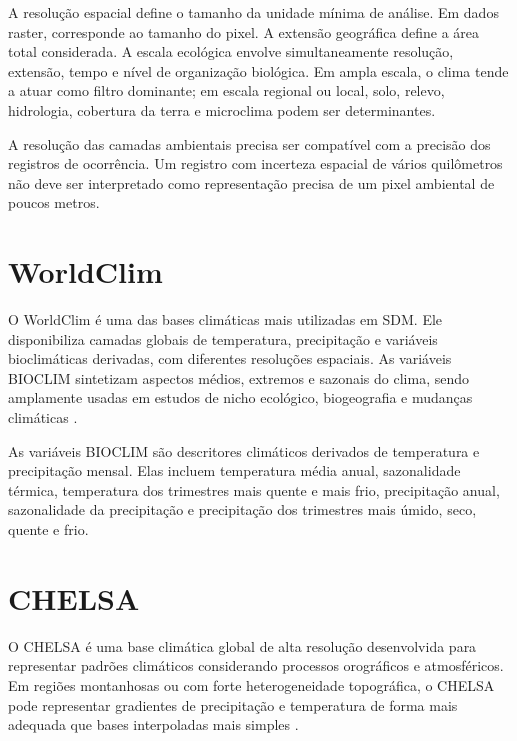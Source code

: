 \documentclass{ueap-sdm}
\begin{document}
A resolução espacial define o tamanho da unidade mínima de análise. Em dados raster, corresponde ao tamanho do pixel. A extensão geográfica define a área total considerada. A escala ecológica envolve simultaneamente resolução, extensão, tempo e nível de organização biológica. Em ampla escala, o clima tende a atuar como filtro dominante; em escala regional ou local, solo, relevo, hidrologia, cobertura da terra e microclima podem ser determinantes.

\begin{atencao}[title={\faExclamationTriangle\quad Compatibilidade entre ocorrência e ambiente}]
	A resolução das camadas ambientais precisa ser compatível com a precisão dos registros de ocorrência. Um registro com incerteza espacial de vários quilômetros não deve ser interpretado como representação precisa de um pixel ambiental de poucos metros.
\end{atencao}

\section{WorldClim}

O WorldClim é uma das bases climáticas mais utilizadas em SDM. Ele disponibiliza camadas globais de temperatura, precipitação e variáveis bioclimáticas derivadas, com diferentes resoluções espaciais. As variáveis BIOCLIM sintetizam aspectos médios, extremos e sazonais do clima, sendo amplamente usadas em estudos de nicho ecológico, biogeografia e mudanças climáticas \parencite{fick2017worldclim}.

\begin{conceito}[title={\faBook\quad Variáveis BIOCLIM}]
	As variáveis BIOCLIM são descritores climáticos derivados de temperatura e precipitação mensal. Elas incluem temperatura média anual, sazonalidade térmica, temperatura dos trimestres mais quente e mais frio, precipitação anual, sazonalidade da precipitação e precipitação dos trimestres mais úmido, seco, quente e frio.
\end{conceito}

\section{CHELSA}

O CHELSA é uma base climática global de alta resolução desenvolvida para representar padrões climáticos considerando processos orográficos e atmosféricos. Em regiões montanhosas ou com forte heterogeneidade topográfica, o CHELSA pode representar gradientes de precipitação e temperatura de forma mais adequada que bases interpoladas mais simples \parencite{karger2017chelsa}.
\end{document}
